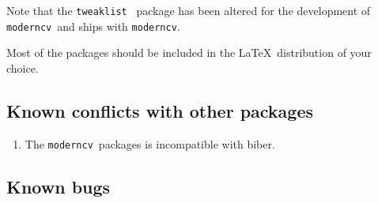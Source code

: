 \documentclass[a4paper,11pt]{article}
\newcommand{\code}[1]{\lstinline!#1!}
\newcommand{\Code}[1]{\lstinline!#1!~} %
\newcommand{\moderncv}{\code{moderncv}}
\newcommand{\Moderncv}{\Code{moderncv}}
\begin{document}
Note that the \Code{tweaklist} package has been altered for the development of \Moderncv and ships 
with \moderncv.

Most of the packages should be included in the \LaTeX\ distribution of your choice.

\subsection{Known conflicts with other packages}
\begin{enumerate}
  \item The \Moderncv packages is incompatible with biber.
\end{enumerate}

\subsection{Known bugs}

\end{document}
